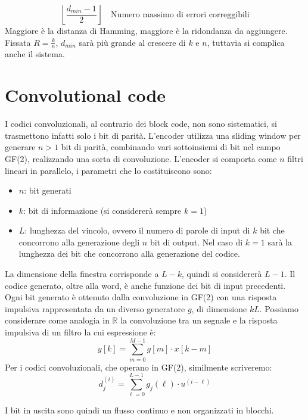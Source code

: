\[
    \left\lfloor \frac{d_{min} - 1}{2} \right\rfloor \quad \text{Numero massimo di errori correggibili}
\]
Maggiore è la distanza di Hamming, maggiore è la ridondanza da aggiungere.
Fissata $R=\frac{k}{n}$, $d_{min}$ sarà più grande al crescere di $k$ e $n$, tuttavia si complica anche il sistema.
\section*{Convolutional code}

I codici convoluzionali, al contrario dei block code, non sono sistematici, si trasmettono infatti solo i bit di parità.
L'encoder utilizza una sliding window per generare $n>1$ bit di parità, combinando vari sottoinsiemi di bit nel campo GF(2), realizzando una sorta di convoluzione.
L'encoder si comporta come $n$ filtri lineari in parallelo, i parametri che lo costituiscono sono:
\begin{itemize}
    \item $n$: bit generati
    \item $k$: bit di informazione (si considererà sempre $k=1$)
    \item $L$: lunghezza del vincolo, ovvero il numero di parole di input di $k$ bit che concorrono alla generazione degli $n$ bit di output. Nel caso di $k=1$ sarà la lunghezza dei bit che concorrono alla generazione del codice.
\end{itemize}

La dimensione della finestra corrisponde a $L-k$, quindi si considererà $L-1$. Il codice generato, oltre alla word, è anche funzione dei bit di input precedenti. Ogni bit generato è ottenuto dalla convoluzione in GF(2) con una risposta impulsiva rappresentata da un diverso generatore $g$, di dimensione $kL$.
Possiamo considerare come analogia in $\mathbb{R}$ la convoluzione tra un segnale e la risposta impulsiva di un filtro la cui espressione è:
\[
    y\left[k\right] = \sum_{m=0}^{M-1} g\left[m\right] \cdot x\left[k-m\right]
\]
Per i codici convoluzionali, che operano in GF(2), similmente scriveremo:
\[
    d_j^{\left(i\right)} = \sum_{\ell=0}^{L-1} g_j\left(\ell\right) \cdot u^{\left( i - \ell \right)}
\]

I bit in uscita sono quindi un flusso continuo e non organizzati in blocchi.

